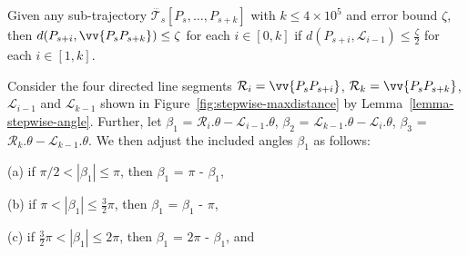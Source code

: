 \vspace{-1ex}
\begin{llemma}
\label{lemma-stepwise-errorbound}
Given any sub-trajectory $\dddot{\mathcal{T}_s}[P_s, \ldots, P_{s+k}]$ with $k\le 4\times 10^5$ and error bound $\zeta$,
then $d(P_{s+i}, {\vv{P_{s}P_{s+k}})}\le \zeta$ for each $i\in[0, k]$ if $d(P_{s+i}, \mathcal{L}_{i-1})\le \frac{\zeta}{2}$ for each $i\in[1, k]$.
\end{llemma}




Consider the four directed line segments  $\mathcal{R}_{i} = \vv{P_sP_{s+i}}$, $\mathcal{R}_{k} = \vv{P_sP_{s+k}}$,  $\mathcal{L}_{i-1}$ and  $\mathcal{L}_{k-1}$
shown in Figure~\ref{fig:stepwise-maxdistance} by Lemma~\ref{lemma-stepwise-angle}.
Further, let $\beta_1$ = $\mathcal{R}_{i}.\theta - \mathcal{L}_{i-1}.\theta$, $\beta_2$ = $\mathcal{L}_{k-1}.\theta - \mathcal{L}_{i}.\theta$, $\beta_3$ = $\mathcal{R}_{k}.\theta - \mathcal{L}_{k-1}.\theta$.
%
We then adjust the included angles $\beta_1$ as follows:

(a) if $\pi/2<|\beta_1|\le \pi$, then $\beta_1$ = $\pi$ - $\beta_1$,

(b) if $\pi<|\beta_1|\le \frac{3}{2}\pi$, then $\beta_1$ = $\beta_1$ - $\pi$,

(c) if $\frac{3}{2}\pi<|\beta_1|\le {2}\pi$, then $\beta_1$ = $2\pi$ - $\beta_1$, and

